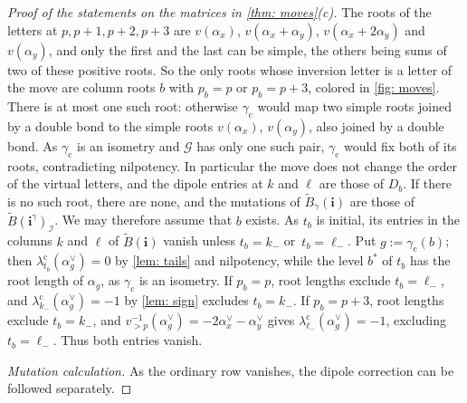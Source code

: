 \documentclass[a4paper]{amsart}
\numberwithin{equation}{section}
\theoremstyle{definition}
\theoremstyle{remark}
\newcommand{\mcG}{\mathcal{G}}
\newcommand{\mcI}{\mathcal{I}}
\newcommand{\bfi}{\mathbf{i}}
\newcommand{\tB}{\widetilde{B}}
\newcommand{\cc}{\mathrm{c}}
\begin{document}
\begin{proof}[Proof of the statements on the matrices in \cref{thm: moves}(c)]
  The roots of the letters at $p,p+1,p+2,p+3$ are $v(\alpha_x)$, $v(\alpha_x+\alpha_y)$, $v(\alpha_x+2\alpha_y)$ and $v(\alpha_y)$, and only the first and the last can be simple, the others being sums of two of these positive roots.
  So the only roots whose inversion letter is a letter of the move are column roots $b$ with $p_b=p$ or $p_b=p+3$, colored in \cref{fig: moves}.
  There is at most one such root: otherwise $\gamma_{\cc}$ would map two simple roots joined by a double bond to the simple roots $v(\alpha_x)$, $v(\alpha_y)$, also joined by a double bond.
  As $\gamma_{\cc}$ is an isometry and $\mcG$ has only one such pair, $\gamma_{\cc}$ would fix both of its roots, contradicting nilpotency.
  In particular the move does not change the order of the virtual letters, and the dipole entries at $k$ and $\ell$ are those of $D_b$.
  If there is no such root, there are none, and the mutations of $\tB_\gamma(\bfi)$ are those of $\tB(\bfi^\gamma)_\mcI$.
  We may therefore assume that $b$ exists.
  As $t_b$ is initial, its entries in the columns $k$ and $\ell$ of $\tB(\bfi)$ vanish unless $t_b=k_-$ or~$t_b=\ell_-$.
  Put $g:=\gamma_{\cc}(b)$; then $\lambda^\cc_{t_b}(\alpha_g^\vee)=0$ by \cref{lem: tails} and nilpotency, while the level $b^*$ of $t_b$ has the root length of $\alpha_g$, as $\gamma_{\cc}$ is an isometry.
  If $p_b=p$, root lengths exclude $t_b=\ell_-$, and $\lambda^\cc_{k_-}(\alpha_g^\vee)=-1$ by \cref{lem: sign} excludes $t_b=k_-$.
  If $p_b=p+3$, root lengths exclude $t_b=k_-$, and $v_{>p}^{-1}(\alpha_g^\vee)=-2\alpha_x^\vee-\alpha_y^\vee$ gives $\lambda^\cc_{\ell_-}(\alpha_g^\vee)=-1$, excluding $t_b=\ell_-$.
  Thus both entries vanish.

  \emph{Mutation calculation.} As the ordinary row vanishes, the dipole correction can be followed separately.


\end{proof}
\end{document}
